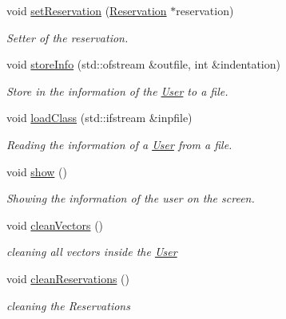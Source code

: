 \begin{DoxyCompactItemize}
\item 
void \mbox{\hyperlink{class_user_ab0e9dba3828977748ad6316eb346a854}{set\+Reservation}} (\mbox{\hyperlink{class_reservation}{Reservation}} $\ast$reservation)
\begin{DoxyCompactList}\small\item\em Setter of the reservation. \end{DoxyCompactList}\item 
void \mbox{\hyperlink{class_user_aac5ff0f6899f3ce56d1b2d12ed557c79}{store\+Info}} (std\+::ofstream \&outfile, int \&indentation)
\begin{DoxyCompactList}\small\item\em Store in the information of the \mbox{\hyperlink{class_user}{User}} to a file. \end{DoxyCompactList}\item 
void \mbox{\hyperlink{class_user_abc12a9ca668bd860a3d6d2ae4791997d}{load\+Class}} (std\+::ifstream \&inpfile)
\begin{DoxyCompactList}\small\item\em Reading the information of a \mbox{\hyperlink{class_user}{User}} from a file. \end{DoxyCompactList}\item 
\mbox{\label{class_user_ac8a201055d02b313721e56c4c0f6af82}} 
void \mbox{\hyperlink{class_user_ac8a201055d02b313721e56c4c0f6af82}{show}} ()
\begin{DoxyCompactList}\small\item\em Showing the information of the user on the screen. \end{DoxyCompactList}\item 
\mbox{\label{class_user_a3ccbaec58dd37260a34dfa84496b30bd}} 
void \mbox{\hyperlink{class_user_a3ccbaec58dd37260a34dfa84496b30bd}{clean\+Vectors}} ()
\begin{DoxyCompactList}\small\item\em cleaning all vectors inside the \mbox{\hyperlink{class_user}{User}} \end{DoxyCompactList}\item 
\mbox{\label{class_user_ab0637e7ec103b32d040a0bc97be0f178}} 
void \mbox{\hyperlink{class_user_ab0637e7ec103b32d040a0bc97be0f178}{clean\+Reservations}} ()
\begin{DoxyCompactList}\small\item\em cleaning the Reservations \end{DoxyCompactList}\item 

\end{DoxyCompactItemize}
